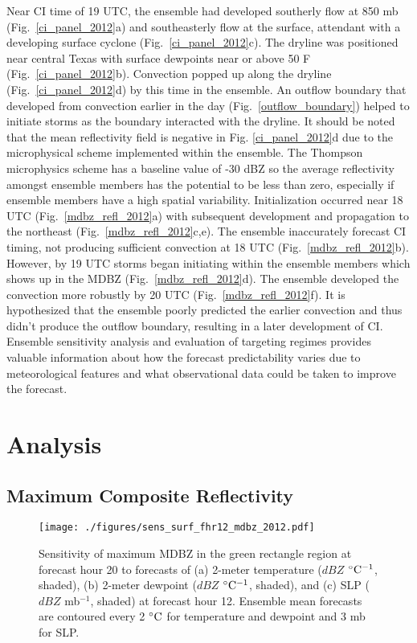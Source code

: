 \documentclass{ttuthes2007}
\newcommand{\tab}{\hspace*{2em}}  %
\begin{document}
\tab Near CI time of 19 UTC, the ensemble had developed southerly flow at 850 mb (Fig.~\ref{ci_panel_2012}a) and southeasterly flow at the surface, attendant with a developing surface cyclone (Fig.~\ref{ci_panel_2012}c). The dryline was positioned near central Texas with surface dewpoints near or above 50 F (Fig.~\ref{ci_panel_2012}b). Convection popped up along the dryline (Fig.~\ref{ci_panel_2012}d) by this time in the ensemble. An outflow boundary that developed from convection earlier in the day (Fig.~\ref{outflow_boundary}) helped to initiate storms as the boundary interacted with the dryline. It should be noted that the mean reflectivity field is negative in Fig. \ref{ci_panel_2012}d due to the microphysical scheme implemented within the ensemble. The Thompson microphysics scheme has a baseline value of -30 dBZ so the average reflectivity amongst ensemble members has the potential to be less than zero, especially if ensemble members have a high spatial variability. Initialization occurred near 18 UTC (Fig.~\ref{mdbz_refl_2012}a) with subsequent development and propagation to the northeast (Fig.~\ref{mdbz_refl_2012}c,e). The ensemble inaccurately forecast CI timing, not producing sufficient convection at 18 UTC (Fig.~\ref{mdbz_refl_2012}b). However, by 19 UTC storms began initiating within the ensemble members which shows up in the MDBZ (Fig.~\ref{mdbz_refl_2012}d). The ensemble developed the convection more robustly by 20 UTC (Fig.~\ref{mdbz_refl_2012}f). It is hypothesized that the ensemble poorly predicted the earlier convection and thus didn't produce the outflow boundary, resulting in a later development of CI. Ensemble sensitivity analysis and evaluation of targeting regimes provides valuable information about how the forecast predictability varies due to meteorological features and what observational data could be taken to improve the forecast.


\section{Analysis}

\subsection{Maximum Composite Reflectivity}

\begin{figure}[!tb]
  \centering
  \noindent\texttt{[image: ./figures/sens\_surf\_fhr12\_mdbz\_2012.pdf]}\\
  \caption{Sensitivity of maximum MDBZ in the green rectangle region at forecast hour 20 to forecasts of (a) 2-meter temperature ($dBZ$ ${}^{\circ} {\rm C^{-1}}$, shaded), (b) 2-meter dewpoint ($dBZ$ ${}^{\circ} {\rm C^{-1}}$, shaded), and (c) SLP ($dBZ$ mb${}^{-1}$, shaded) at forecast hour 12. Ensemble mean forecasts are contoured every 2 ${}^{\circ} {\rm C}$ for temperature and dewpoint and 3 mb for SLP.}
\label{sens_surf_fhr12_mdbz_2012}
\end{figure}
\end{document}
